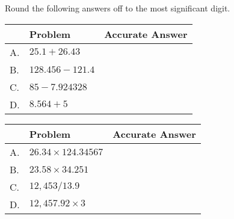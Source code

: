 \vspace{0.5cm}

Round the following answers off to the most significant digit.\\

\begin{tabular}{|l|l|l|}
\hline
 & Problem & Accurate Answer \\
\hline
A. & $25.1+26.43$ &  \\
\hline
B. & $128.456-121.4$ &  \\
\hline
C. & $85-7.924328$ &  \\
\hline
D. & $8.564+5$ &  \\
\hline
\end{tabular}

\begin{tabular}{|l|l|l|}
\hline
 & Problem & Accurate Answer \\
\hline
A. & $26.34 \times 124.34567$ &  \\
\hline
B. & $23.58 \times 34.251$ &  \\
\hline
C. & $12,453 / 13.9$ &  \\
\hline
D. & $12,457.92 \times 3$&  \\
\hline
\end{tabular}


